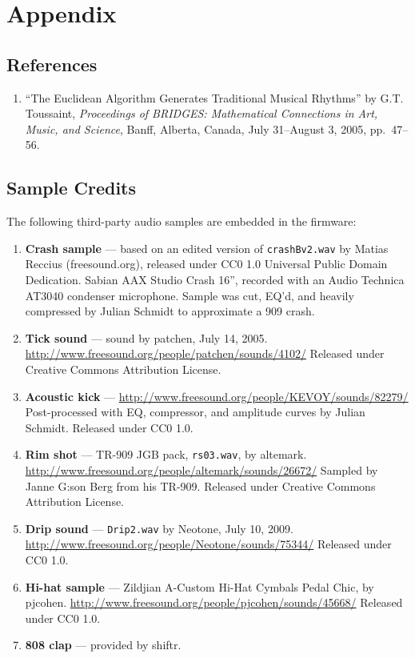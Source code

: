 \section{Appendix}\label{appendix}

\subsection{References}\label{references}

\begin{enumerate}
\def\labelenumi{\arabic{enumi}.}
\tightlist
\item
  ``The Euclidean Algorithm Generates Traditional Musical Rhythms'' by
  G.T. Toussaint, \emph{Proceedings of BRIDGES: Mathematical Connections
  in Art, Music, and Science}, Banff, Alberta, Canada, July 31--August
  3, 2005, pp.~47--56.
\end{enumerate}

\subsection{Sample Credits}\label{sample-credits}

The following third-party audio samples are embedded in the firmware:

\begin{enumerate}
\def\labelenumi{\arabic{enumi}.}
\setcounter{enumi}{1}
\item
  \textbf{Crash sample} --- based on an edited version of
  \texttt{crashBv2.wav} by Matias Reccius (freesound.org), released
  under CC0 1.0 Universal Public Domain Dedication. Sabian AAX Studio
  Crash 16'', recorded with an Audio Technica AT3040 condenser
  microphone. Sample was cut, EQ'd, and heavily compressed by Julian
  Schmidt to approximate a 909 crash.
\item
  \textbf{Tick sound} --- sound by patchen, July 14, 2005.
  \url{http://www.freesound.org/people/patchen/sounds/4102/} Released
  under Creative Commons Attribution License.
\item
  \textbf{Acoustic kick} ---
  \url{http://www.freesound.org/people/KEVOY/sounds/82279/}
  Post-processed with EQ, compressor, and amplitude curves by Julian
  Schmidt. Released under CC0 1.0.
\item
  \textbf{Rim shot} --- TR-909 JGB pack, \texttt{rs03.wav}, by altemark.
  \url{http://www.freesound.org/people/altemark/sounds/26672/} Sampled
  by Janne G:son Berg from his TR-909. Released under Creative Commons
  Attribution License.
\item
  \textbf{Drip sound} --- \texttt{Drip2.wav} by Neotone, July 10, 2009.
  \url{http://www.freesound.org/people/Neotone/sounds/75344/} Released
  under CC0 1.0.
\item
  \textbf{Hi-hat sample} --- Zildjian A-Custom Hi-Hat Cymbals Pedal
  Chic, by pjcohen.
  \url{http://www.freesound.org/people/pjcohen/sounds/45668/} Released
  under CC0 1.0.
\item
  \textbf{808 clap} --- provided by shiftr.
\end{enumerate}
